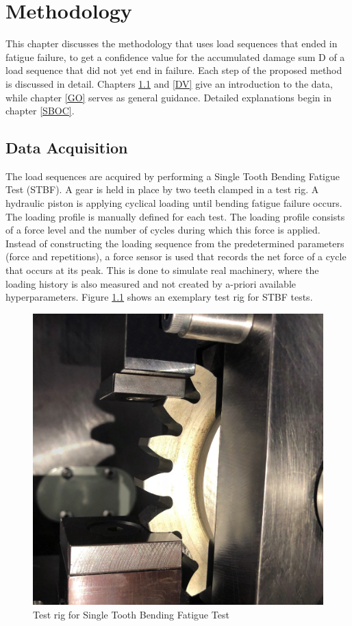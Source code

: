\chapter{Methodology}\label{MET}
This chapter discusses the methodology that uses load sequences that ended in fatigue failure, to get a confidence value for the accumulated damage sum D of a load sequence that did not yet end in failure. Each step of the proposed method is discussed in detail. Chapters \ref{DA} and \ref{DV} give an introduction to the data, while chapter \ref{GO} serves as general guidance. Detailed explanations begin in chapter \ref{SBOC}.

\section{Data Acquisition}\label{DA}
The load sequences are acquired by performing a Single Tooth Bending Fatigue Test (STBF). A gear is held in place by two teeth clamped in a test rig. A hydraulic piston is applying cyclical loading until bending fatigue failure occurs. The loading profile is manually defined for each test. The loading profile consists of a force level and the number of cycles during which this force is applied. Instead of constructing the loading sequence from the predetermined parameters (force and repetitions), a force sensor is used that records the net force of a cycle that occurs at its peak. This is done to simulate real machinery, where the loading history is also measured and not created by a-priori available hyperparameters. 
Figure \ref{fig:STBFT} shows an exemplary test rig for STBF tests.
\begin{figure}[H]
	\centering
	\includegraphics[width=0.5\linewidth]{IMGs/tooth.jpg}
	\caption{Test rig for Single Tooth Bending Fatigue Test \cite{STBT}}
	\label{fig:STBFT}
\end{figure}
\newpage
